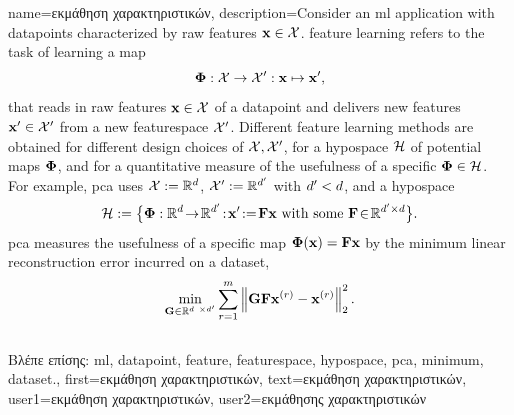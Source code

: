 {name={\foreignlanguage{greek}{εκμάθηση χαρακτηριστικών}},
	description={Consider an \gls{ml} application with \gls{datapoint}s characterized by 
		raw \gls{feature}s ${\bf x} \in \mathcal{X}$. \Gls{feature} learning 
		refers to the task of learning a map 
		$${\bf \Phi}: \mathcal{X} \rightarrow \mathcal{X}': {\bf x} \mapsto {\bf x}',$$ 
		that reads in raw \gls{feature}s ${\bf x} \in \mathcal{X}$ of a \gls{datapoint} and delivers new 
		\gls{feature}s ${\bf x}' \in \mathcal{X}'$ from a new \gls{featurespace} $\mathcal{X}'$. 
		Different \gls{feature} learning methods are obtained for different design 
		choices of $\mathcal{X},\mathcal{X}'$, for a \gls{hypospace} $\mathcal{H}$ 
		of potential maps ${\bf \Phi}$, and for a quantitative measure of the usefulness of 
		a specific ${\bf \Phi} \in \mathcal{H}$. For example, \gls{pca} 
		uses $\mathcal{X} := \mathbb{R}^{d}$, $\mathcal{X}' := \mathbb{R}^{d'}$ 
		with $d' < d$, and a \gls{hypospace} 
		$$\hypospace\defeq \big\{ \featuremapvec: \mathbb{R}^{\dimlocalmodel}
		\!\rightarrow\! \mathbb{R}^{\dimlocalmodel'}\!:\!\featurevec'\!\defeq\!\mF \featurevec \mbox{ with some } \mF \!\in\! \mathbb{R}^{\dimlocalmodel' \times \dimlocalmodel} \big\}.$$ \Gls{pca} measures the usefulness of a specific map ${\bf \Phi}({\bf x})= \mathbf{F} {\bf x}$ 
	by the \gls{minimum} linear reconstruction error incurred on a \gls{dataset}, 
$$ \min_{\mG \in \mathbb{R}^{\dimlocalmodel \times \dimlocalmodel'}} \sum_{\sampleidx=1}^{\samplesize} \normgeneric{\mG \mF \featurevec^{(\sampleidx)} - \featurevec^{(\sampleidx)}}{2}^{2}.$$ \\
\foreignlanguage{greek}{Βλέπε επίσης:} \gls{ml}, \gls{datapoint}, \gls{feature}, \gls{featurespace}, \gls{hypospace}, \gls{pca}, \gls{minimum}, \gls{dataset}.}, 
	first={\foreignlanguage{greek}{εκμάθηση χαρακτηριστικών}},
	text={\foreignlanguage{greek}{εκμάθηση χαρακτηριστικών}},
	user1={\foreignlanguage{greek}{εκμάθηση χαρακτηριστικών}}, %
	user2={\foreignlanguage{greek}{εκμάθησης χαρακτηριστικών}} %
} 


